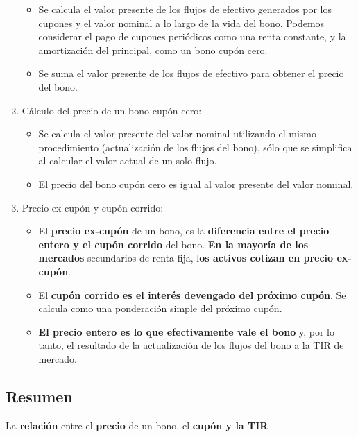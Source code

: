 \documentclass[
  letterpaper,
  DIV=11,
  numbers=noendperiod]{scrreprt}
\begin{document}
\begin{tcolorbox}
\begin{enumerate}
  \begin{itemize}
  \item
    Se calcula el valor presente de los flujos de efectivo generados por
    los cupones y el valor nominal a lo largo de la vida del bono.
    Podemos considerar el pago de cupones periódicos como una renta
    constante, y la amortización del principal, como un bono cupón cero.
  \item
    Se suma el valor presente de los flujos de efectivo para obtener el
    precio del bono.
  \end{itemize}
\item
  Cálculo del precio de un bono cupón cero:

  \begin{itemize}
  \item
    Se calcula el valor presente del valor nominal utilizando el mismo
    procedimiento (actualización de los flujos del bono), sólo que se
    simplifica al calcular el valor actual de un solo flujo.
  \item
    El precio del bono cupón cero es igual al valor presente del valor
    nominal.
  \end{itemize}
\item
  Precio ex-cupón y cupón corrido:

  \begin{itemize}
  \item
    El \textbf{precio ex-cupón} de un bono, es la \textbf{diferencia
    entre el precio entero y el cupón corrido} del bono. \textbf{En la
    mayoría de los mercados} secundarios de renta fija, l\textbf{os
    activos cotizan en precio ex-cupón}.
  \item
    El \textbf{cupón corrido es el interés devengado del próximo cupón}.
    Se calcula como una ponderación simple del próximo cupón.
  \item
    \textbf{El precio entero es lo que efectivamente vale el bono} y,
    por lo tanto, el resultado de la actualización de los flujos del
    bono a la TIR de mercado.
  \end{itemize}
\end{enumerate}

\subsection{Resumen}\label{resumen}

La \textbf{relación} entre el \textbf{precio} de un bono, el
\textbf{cupón y la TIR}


\end{tcolorbox}
\end{document}
